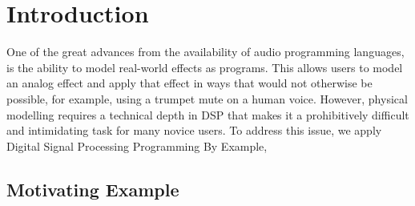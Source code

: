 \section{Introduction}

One of the great advances from the availability of audio programming languages, is the ability to model real-world effects as programs.
This allows users to model an analog effect and apply that effect in ways that would not otherwise be possible, for example, using a trumpet mute on a human voice.
However, physical modelling requires a technical depth in DSP that makes it a prohibitively difficult and intimidating task for many novice users.
To address this issue, we apply Digital Signal Processing Programming By Example, 



\subsection{Motivating Example}

